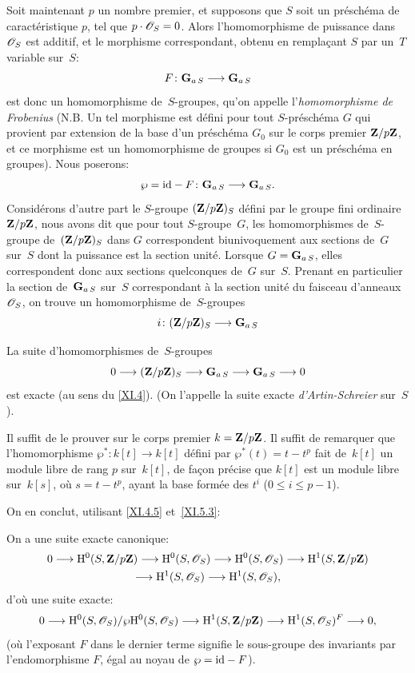 Soit maintenant $p$ un nombre premier, et supposons que $S$ soit un
pr\'esch\'ema de caract\'eristique $p$, \ie tel que
$p\cdot\cal{O}_S=0$. Alors l'homomorphisme de puissance \pieme
dans $\cal{O}_S$ est additif, et le morphisme correspondant, obtenu en
rempla\c cant $S$ par un~$T$ variable sur~$S$:
$$
F\colon\GG_{a\,S}\to\GG_{a\,S}
$$
est donc un homomorphisme de~$S$-groupes, qu'on appelle
l'\emph{homomorphisme de Frobenius} (N.B. Un tel morphisme est
d\'efini pour tout $S$-pr\'esch\'ema $G$ qui provient par
extension de la base d'un pr\'esch\'ema $G_0$ sur le corps premier
$\mathbf{Z}/p\mathbf{Z}$, et ce morphisme est un homomorphisme de groupes si $G_0$
est un pr\'esch\'ema en groupes). Nous poserons:
$$
\wp=\id-F\colon\GG_{a\,S}\to\GG_{a\,S}.
$$
Consid\'erons d'autre part le $S$-groupe $(\mathbf{Z}/p\mathbf{Z})_S$ d\'efini
par le groupe fini ordinaire~$\mathbf{Z}/p\mathbf{Z}$, nous avons dit que pour tout
$S$-groupe~$G$, les homomorphismes de~$S$-groupe de~$(\mathbf{Z}/p\mathbf{Z})_S$
dans $G$ correspondent biunivoquement aux sections de~$G$ sur~$S$ dont
la puissance \pieme est la section unit\'e. Lorsque
$G=\mathbf{G}_{a\,S}$, elles correspondent
donc aux sections quelconques de~$G$ sur~$S$. Prenant en particulier
la section de~$\mathbf{G}_{a\,S}$ sur~$S$ correspondant \`a la section
unit\'e du faisceau d'anneaux $\cal{O}_S$, on trouve un
homomorphisme de~$S$-groupes
$$
i\colon(\ZZ/p\ZZ)_S\to\GG_{a\,S}
$$

\begin{proposition}
\label{XI.6.7} La suite d'homomorphismes de~$S$-groupes
$$
0\to(\ZZ/p\ZZ)_S\to\GG_{a\,S}\to \GG_{a\,S}\to 0
$$
est exacte (au sens du \No \ref{XI.4}). (On l'appelle la suite exacte
\emph{d'Artin-Schreier} sur~$S$).
\end{proposition}

Il suffit de le prouver sur le corps premier $k=\mathbf{Z}/p\mathbf{Z}$. Il suffit
de remarquer que l'homomorphisme $\wp^*\colon k[t]\to k[t]$ d\'efini
par $\wp^*(t)=t-t^p$ fait de~$k[t]$ un module libre de rang $p$ sur~$k[t]$, de fa\c con pr\'ecise que $k[t]$ est un module libre sur~$k[s]$, o\`u $s=t-t^p$, ayant la base form\'ee des $t^i$ ($0\leq i\leq p-1$).

On en conclut, utilisant \ref{XI.4.5} et~\ref{XI.5.3}:

\begin{proposition}
\label{XI.6.8} On a une suite exacte canonique:
\begin{multline*}
0\to\H^0(S,\ZZ/p\ZZ)\to\H^0(S,\cal{O}_S)\to\H^0(S,\cal{O}_S)\to
\H^1(S,\ZZ/p\ZZ)\\
\to\H^1(S,\cal{O}_S)\to\H^1(S,\cal{O}_S),
\end{multline*}
d'o\`u une suite exacte:
$$
0\to\H^0(S,\cal{O}_S)/\wp\H^0(S,\cal{O}_S)\to
\H^1(S,\ZZ/p\ZZ)\to\H^1(S,\cal{O}_S)^F\to 0,
$$
(o\`u l'exposant $F$ dans le dernier terme signifie le sous-groupe
des invariants par l'endomorphisme $F$, \'egal au noyau de
$\wp=\mathrm{id}-F$).
\end{proposition}

